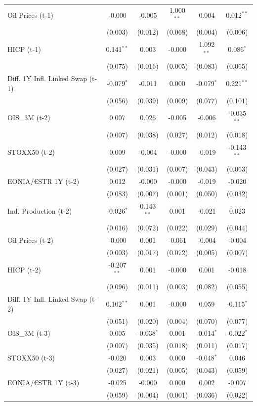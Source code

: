 \begin{longtable}[t]{lccccc}
Oil Prices (t-1) & -0.000 & -0.005 & 1.000$^{**}$ & 0.004 & 0.012$^{**}$\\
 & (0.003) & (0.012) & (0.068) & (0.004) & (0.006)\\
HICP (t-1) & 0.141$^{**}$ & 0.003 & -0.000 & 1.092$^{**}$ & 0.086$^{*}$\\
 & (0.075) & (0.016) & (0.005) & (0.083) & (0.065)\\
Diff. 1Y Infl. Linked Swap (t-1) & -0.079$^{*}$ & -0.011 & 0.000 & -0.079$^{*}$ & 0.221$^{**}$\\
 & (0.056) & (0.039) & (0.009) & (0.077) & (0.101)\\
OIS\_3M (t-2) & 0.007 & 0.026 & -0.005 & -0.006 & -0.035$^{**}$\\
 & (0.007) & (0.038) & (0.027) & (0.012) & (0.018)\\
STOXX50 (t-2) & 0.009 & -0.004 & -0.000 & -0.019 & -0.143$^{**}$\\
 & (0.027) & (0.031) & (0.007) & (0.043) & (0.063)\\
EONIA/€STR 1Y (t-2) & 0.012 & -0.000 & -0.000 & -0.019 & -0.020\\
 & (0.083) & (0.007) & (0.001) & (0.050) & (0.032)\\
Ind. Production (t-2) & -0.026$^{*}$ & 0.143$^{**}$ & 0.001 & -0.021 & 0.023\\
 & (0.016) & (0.072) & (0.022) & (0.029) & (0.044)\\
Oil Prices (t-2) & -0.000 & 0.001 & -0.061 & -0.004 & -0.004\\
 & (0.003) & (0.017) & (0.072) & (0.005) & (0.007)\\
HICP (t-2) & -0.207$^{**}$ & 0.001 & -0.000 & 0.001 & -0.018\\
 & (0.096) & (0.011) & (0.003) & (0.082) & (0.055)\\
Diff. 1Y Infl. Linked Swap (t-2) & 0.102$^{**}$ & 0.001 & -0.000 & 0.059 & -0.115$^{*}$\\
 & (0.051) & (0.020) & (0.004) & (0.070) & (0.077)\\
OIS\_3M (t-3) & 0.005 & -0.038$^{*}$ & 0.001 & -0.014$^{*}$ & -0.022$^{*}$\\
 & (0.007) & (0.035) & (0.018) & (0.011) & (0.017)\\
STOXX50 (t-3) & -0.020 & 0.003 & 0.000 & -0.048$^{*}$ & 0.046\\
 & (0.027) & (0.021) & (0.005) & (0.043) & (0.059)\\
EONIA/€STR 1Y (t-3) & -0.025 & -0.000 & 0.000 & 0.002 & -0.007\\
 & (0.059) & (0.004) & (0.001) & (0.036) & (0.022)\\

\end{longtable}
